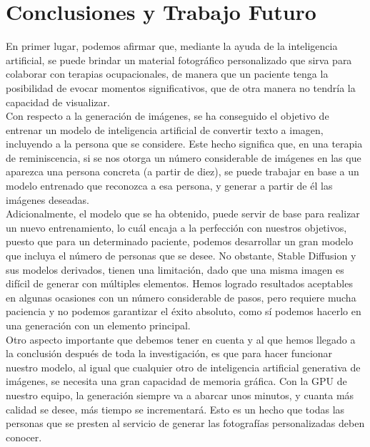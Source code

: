 \chapter{Conclusiones y Trabajo Futuro}
\label{cap:conclusiones}

En primer lugar, podemos afirmar que, mediante la ayuda de la inteligencia artificial, se puede brindar un material fotográfico personalizado que sirva para colaborar con terapias ocupacionales, de manera que un paciente tenga la posibilidad de evocar momentos significativos, que de otra manera no tendría la capacidad de visualizar.\\

Con respecto a la generación de imágenes, se ha conseguido el objetivo de entrenar un modelo de inteligencia artificial de convertir texto a imagen, incluyendo a la persona que se considere. Este hecho significa que, en una terapia de reminiscencia, si se nos otorga un número considerable de imágenes en las que aparezca una persona concreta (a partir de diez), se puede trabajar en base a un modelo entrenado que reconozca a esa persona, y generar a partir de él las imágenes deseadas.\\

Adicionalmente, el modelo que se ha obtenido, puede servir de base para realizar un nuevo entrenamiento, lo cuál encaja a la perfección con nuestros objetivos, puesto que para un determinado paciente, podemos desarrollar un gran modelo que incluya el número de personas que se desee. No obstante, Stable Diffusion y sus modelos derivados, tienen una limitación, dado que una misma imagen es difícil de generar con múltiples elementos. Hemos logrado resultados aceptables en algunas ocasiones con un número considerable de pasos, pero requiere mucha paciencia y no podemos garantizar el éxito absoluto, como sí podemos hacerlo en una generación con un elemento principal.\\

Otro aspecto importante que debemos tener en cuenta y al que hemos llegado a la conclusión después de toda la investigación, es que para hacer funcionar nuestro modelo, al igual que cualquier otro de inteligencia artificial generativa de imágenes, se necesita una gran capacidad de memoria gráfica. Con la GPU de nuestro equipo, la generación siempre va a abarcar unos minutos, y cuanta más calidad se desee, más tiempo se incrementará. Esto es un hecho que todas las personas que se presten al servicio de generar las fotografías personalizadas deben conocer.\\

